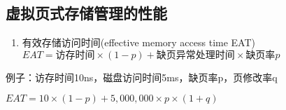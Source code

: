 \subsection{虚拟页式存储管理的性能}
\begin{enumerate}
	\item 有效存储访问时间(effective memory access time EAT)
	\\ $EAT=\text{访存时间}\times(1-p)+\text{缺页异常处理时间}\times \text{缺页率}p$
\end{enumerate}
例子：访存时间10ns，磁盘访问时间5ms，缺页率p，页修改率q
\par $EAT=10\times(1-p)+5,000,000\times p\times (1+q)$